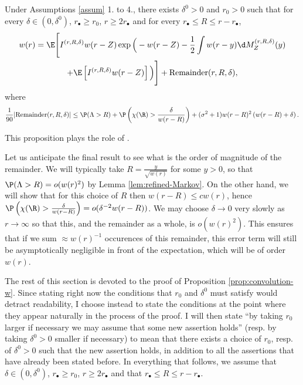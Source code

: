 \documentclass[10pt,a4paper]{article}
\begin{document}
\begin{proposition}\label{prop:convolution-w}
Under Assumptions \ref{assum} 1. to 4., there exists $\delta^0>0$ and $r_0>0$ such that for every $\delta \in (0,\delta^0)$, $r_\bullet \geq r_0$, $r\geq 2r_\bullet$ and for every $r_\bullet \leq R \leq  r-r_\bullet$, 
\begin{multline}\label{eq:convolution-w}
w(r) = \E\Bigg[ I^{(r,R,\delta)} w(r-Z) \exp\Big( - w(r-Z) - \frac{1}{2} \int w(r-y) \d M^{(r,R,\delta)}_{Z} (y) \\
+ \E\left[ I^{(r,R,\delta)} w(r-Z) \right] \Big) \Bigg] + \mathrm{Remainder}(r,R,\delta) ,
\end{multline}
where
\begin{equation*} 
\frac{1}{90}|\mathrm{Remainder}(r,R,\delta)| \leq \P(\Lambda>R) + \P\left(\chi(\R)>\frac{\delta}{w(r-R)}\right) + (\sigma^2 + 1) w(r-R)^2 \left( w(r-R) + \delta \right) .
\end{equation*}
\end{proposition}

This proposition plays the role of \cite[(11)]{lalley2015maximal}. 

\begin{remark}
Let us anticipate the final result to see what is the order of magnitude of the remainder. We will typically take $R = \frac{y}{\sqrt{w(r)}}$ for some $y>0$, so that $\P(\Lambda>R) = o(w(r)^2)$ by Lemma \ref{lem:refined-Markov}. On the other hand, we will show that for this choice of $R$ then $w(r-R) \leq c w(r)$, hence $\P\left(\chi(\R)>\frac{\delta}{w(r-R)}\right) = o(\delta^{-2} w(r-R))$. We may choose $\delta \to 0$ very slowly as $r\to\infty$ so that this, and the remainder as a whole, is $o(w(r)^2)$. This ensures that if we sum $\approx w(r)^{-1}$ occurences of this remainder, this error term will still be asymptotically negligible in front of the expectation, which will be of order $w(r)$. 
\end{remark}




The rest of this section is devoted to the proof of Proposition \ref{prop:convolution-w}. Since stating right now the conditions that $r_0$ and $\delta^0$ must satisfy would detract readability, I choose instead to state the conditions at the point where they appear naturally in the process of the proof. I will then state ``by taking $r_0$ larger if necessary we may assume that some new assertion holds'' (resp. by taking $\delta^0>0$ smaller if necessary) to mean that there exists a choice of $r_0$, resp. of $\delta^0>0$ such that the new assertion holds, in addition to all the assertions that have already been stated before. 
In everything that follows, we assume that $\delta \in (0,\delta^0)$, $r_\bullet \geq r_0$, $r\geq 2r_\bullet$ and that $r_\bullet \leq R \leq  r-r_\bullet$. 
\end{document}
